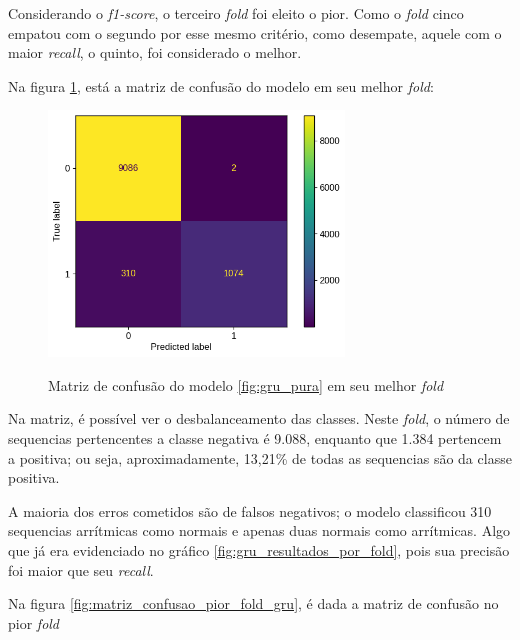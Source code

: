 Considerando o \textit{f1-score}, o terceiro \textit{fold} foi eleito o pior. Como o \textit{fold} cinco empatou com o segundo por 
esse mesmo critério, como desempate, aquele com o maior \textit{recall}, o quinto, foi considerado o melhor. 

Na figura \ref{fig:matriz_confusao_melhor_fold_gru}, está a matriz de confusão do modelo em seu melhor \textit{fold}:

\begin{figure}[H]
  \centering
  \caption{Matriz de confusão do modelo \ref{fig:gru_pura} em seu melhor \textit{fold}}
   \includegraphics[width=0.7\textwidth]{figuras/modelos_resultados/gru/matriz_confusao_melhor_fold_gru_alt.png} %
  \label{fig:matriz_confusao_melhor_fold_gru}
\end{figure}

Na matriz, é possível ver o desbalanceamento das classes. Neste \textit{fold}, o número de sequencias pertencentes a classe
negativa é 9.088, enquanto que 1.384 pertencem a positiva; ou seja, aproximadamente, 13,21\% de todas as sequencias são
da classe positiva. 

A maioria dos erros cometidos são de falsos negativos; o modelo classificou 310 sequencias arrítmicas como normais e 
apenas duas normais como arrítmicas. Algo que já era evidenciado no gráfico \ref{fig:gru_resultados_por_fold}, pois 
sua precisão foi maior que seu \textit{recall}.

Na figura \ref{fig:matriz_confusao_pior_fold_gru}, é dada a matriz de confusão no pior \textit{fold}

